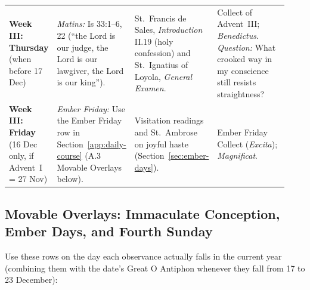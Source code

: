 {\begin{longtable}{>{\raggedright\arraybackslash}p{0.14\linewidth}>{\raggedright\arraybackslash}p{0.25\linewidth}>{\raggedright\arraybackslash}p{0.28\linewidth}>{\raggedright\arraybackslash}p{0.26\linewidth}}
\textbf{Week III: Thursday} (when before 17 Dec) & \textit{Matins:} Is 33:1--6, 22 (``the Lord is our judge, the Lord is our lawgiver, the Lord is our king''). & St.~Francis de Sales, \textit{Introduction} II.19 (holy confession) and St.~Ignatius of Loyola, \textit{General Examen}. & Collect of Advent~III; \textit{Benedictus}. \textit{Question:} What crooked way in my conscience still resists straightness?\\
\textbf{Week III: Friday} (16 Dec only, if Advent~I = 27 Nov) & \textit{Ember Friday:} Use the Ember Friday row in Section~\ref{app:daily-course} (A.3 Movable Overlays below). & Visitation readings and St.~Ambrose on joyful haste (Section~\ref{sec:ember-days}). & Ember Friday Collect (\textit{Excita}); \textit{Magnificat}.\\
\bottomrule
\end{longtable}
}

\subsection{Movable Overlays: Immaculate Conception, Ember Days, and Fourth Sunday}

Use these rows on the day each observance actually falls in the current year
(combining them with the date's Great O Antiphon whenever they fall from 17 to
23 December):

